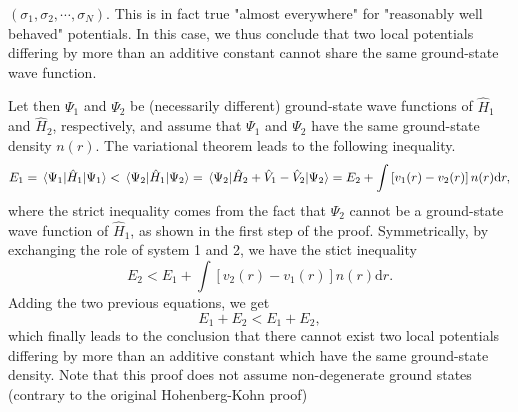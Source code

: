 $(\sigma_1,\sigma_2,\cdots,\sigma_N)$. This is in fact true "almost everywhere"
for "reasonably well behaved" potentials. In this case, we thus conclude that
two local potentials differing by more than an additive constant cannot share
the same ground-state wave function.
\par Let then $\Psi_1$ and $\Psi_2$ be (necessarily different) ground-state
wave functions of $\hat{H}_1$ and $\hat{H}_2$, respectively, and assume that
$\Psi_1$ and $\Psi_2$ have the same ground-state density $n(r)$. The
variational theorem leads to the following inequality. 
\begin{equation}
  E_1= \mel{\Psi_1}{\hat{H}_1}{\Psi_1}<\mel{\Psi_2}{\hat{H}_1}{\Psi_2}
  = \mel{\Psi_2}{\hat{H}_2 + \hat{V}_1 - \hat{V}_2}{\Psi_2} = E_2
  + \int\left[v_1(r) - v_2(r)\right]n(r)\mathrm{d}r,
\end{equation}
where the strict inequality comes from the fact that $\Psi_2$ cannot be
a ground-state
wave function of $\hat{H}_1$, as shown in the first step of the proof.
Symmetrically, by exchanging the role of system 1 and 2, we have the stict
inequality
\begin{equation}
  E_2 < E_1 + \int\left[v_2(r) - v_1(r)\right]n(r)\mathrm{d}r.
\end{equation}
Adding the two previous equations, we get
\begin{equation}
E_1 + E_2 < E_1 + E_2,
\end{equation}
which finally leads to the conclusion that there cannot exist two local
potentials differing by more than an additive constant which have the same
ground-state density. Note that this proof does not assume non-degenerate
ground states (contrary to the original Hohenberg-Kohn proof) \blacksquare

